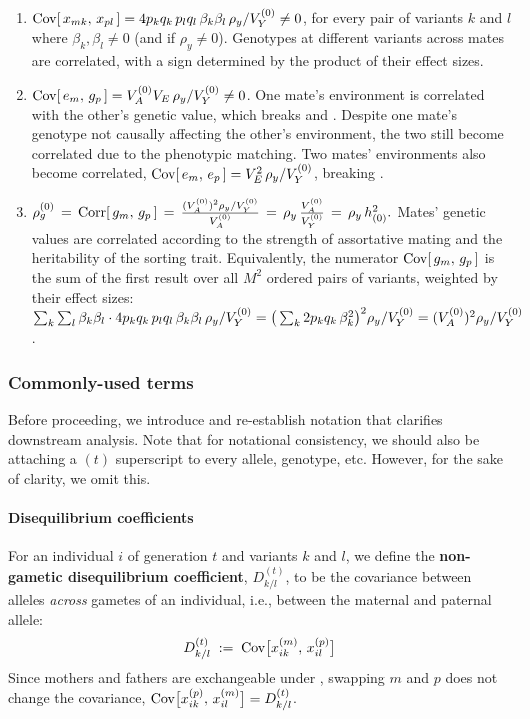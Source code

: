 \documentclass[12pt]{article}
\numberwithin{equation}{section}
\begin{document}
\begin{enumerate}[nosep]
    \item $\mathrm{Cov}[\,x_{mk},\, x_{pl}\,] = 4p_k q_k\,p_l q_l\,\beta_k\beta_l\,\rho_y/V_Y^{(0)} \neq 0$, for every pair of variants $k$ and $l$ where $\beta_k , \beta_l \neq 0$ (and if $\rho_y \neq 0$).
    Genotypes at different variants across mates are correlated, with a sign determined by the product of their effect sizes.
    \item $\mathrm{Cov}[\,e_m,\, g_p\,] = V_A^{(0)} V_E \,\rho_y/V_Y^{(0)} \neq 0$.
    One mate's environment is correlated with the other's genetic value, which breaks  and .
    Despite one mate's genotype not causally affecting the other's environment, the two still become correlated due to the phenotypic matching.
    Two mates' environments also become correlated, $\mathrm{Cov}[\,e_m,\, e_p\,] = V_E^2\,\rho_y/V_Y^{(0)}$, breaking .
    \item\label{item:rhog-hsq} $\rho_g^{(0)} \,=\, \mathrm{Corr}[\,g_m,\, g_p\,] \,=\, \frac{(V_A^{(0)})^2 \rho_y/V_Y^{(0)}}{V_A^{(0)}} \,=\, \rho_y\,\frac{V_A^{(0)}}{V_Y^{(0)}} \,=\, \rho_y\,h^2_{(0)} . $
    Mates' genetic values are correlated according to the strength of assortative mating and the heritability of the sorting trait.
    Equivalently, the numerator $\mathrm{Cov}[\,g_m,\, g_p\,]$ is the sum of the first result over all $M^2$ ordered pairs of variants, weighted by their effect sizes: $\sum_{k}\sum_{l}\beta_k\beta_l \cdot 4p_k q_k\,p_l q_l\,\beta_k\beta_l\,\rho_y/V_Y^{(0)} = \big(\sum_k 2p_k q_k\,\beta_k^2\big)^2\rho_y/V_Y^{(0)} = (V_A^{(0)})^2\rho_y/V_Y^{(0)}$.
\end{enumerate}

\subsubsection{Commonly-used terms}
Before proceeding, we introduce and re-establish notation that clarifies downstream analysis.
Note that for notational consistency, we should also be attaching a ${(t)}$ superscript to every allele, genotype, etc.
However, for the sake of clarity, we omit this.

\paragraph{Disequilibrium coefficients}

For an individual $i$ of generation $t$ and variants $k$ and $l$, we define the \textbf{non-gametic disequilibrium coefficient}, $D^{(t)}_{k/l}$, to be the covariance between alleles \emph{across} gametes of an individual, i.e., between the maternal and paternal allele:
\begin{equation}\label{eq:D-nongametic}
    D^{(t)}_{k/l} \;:=\; \mathrm{Cov}\big[x^{(m)}_{ik},\, x^{(p)}_{il}\big]
\end{equation}
Since mothers and fathers are exchangeable under , swapping $m$ and $p$ does not change the covariance, $\mathrm{Cov}\big[x^{(p)}_{ik},\, x^{(m)}_{il}\big] = D^{(t)}_{k/l}$.
\end{document}
